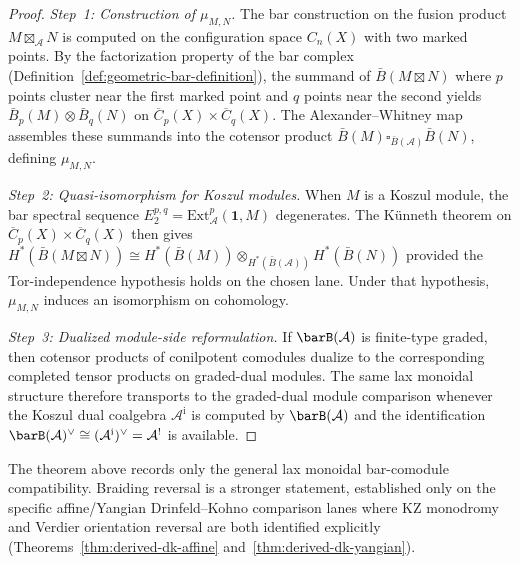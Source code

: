 \begin{proof}
\emph{Step~1: Construction of $\mu_{M,N}$.}
The bar construction on the fusion product
$M \boxtimes_{\mathcal{A}} N$ is computed on the configuration space
$C_n(X)$ with two marked points. By the factorization property of
the bar complex (Definition~\ref{def:geometric-bar-definition}), the
summand of $\bar{B}(M \boxtimes N)$ where $p$ points cluster
near the first marked point and $q$ points near the second yields
$\bar{B}_p(M) \otimes \bar{B}_q(N)$ on
$\overline{C}_p(X) \times \overline{C}_q(X)$. The Alexander--Whitney
map assembles these summands into the cotensor product
$\bar{B}(M) \square_{\bar{B}(\mathcal{A})} \bar{B}(N)$, defining
$\mu_{M,N}$.

\emph{Step~2: Quasi-isomorphism for Koszul modules.}
When $M$ is a Koszul module, the bar spectral sequence
$E_2^{p,q} = \mathrm{Ext}^p_{\mathcal{A}}(\mathbf{1}, M)$
degenerates. The K\"unneth theorem on
$\overline{C}_p(X) \times \overline{C}_q(X)$ then gives
$H^*(\bar{B}(M \boxtimes N))
\cong H^*(\bar{B}(M)) \otimes_{H^*(\bar{B}(\mathcal{A}))}
H^*(\bar{B}(N))$
provided the Tor-independence hypothesis holds on the chosen lane.
Under that hypothesis, $\mu_{M,N}$ induces an isomorphism on
cohomology.

\emph{Step~3: Dualized module-side reformulation.}
If $\barB(\mathcal{A})$ is finite-type graded, then cotensor products
of conilpotent comodules dualize to the corresponding completed tensor
products on graded-dual modules. The same lax monoidal structure
therefore transports to the graded-dual module comparison whenever the
Koszul dual coalgebra $\mathcal{A}^{\mathrm{i}}$ is computed by
$\barB(\mathcal{A})$ and the identification
$\barB(\mathcal{A})^\vee \cong
(\mathcal{A}^{\mathrm{i}})^\vee=\mathcal{A}^!$ is available.
\end{proof}

\begin{remark}
\label{rem:module-bar-braiding-scope}
The theorem above records only the general lax monoidal bar-comodule
compatibility. Braiding reversal is a stronger statement, established
only on the specific affine/Yangian Drinfeld--Kohno comparison lanes
where KZ monodromy and
Verdier orientation reversal are both identified explicitly
\textup{(}Theorems~\ref{thm:derived-dk-affine}
and~\ref{thm:derived-dk-yangian}\textup{)}.
\end{remark}

